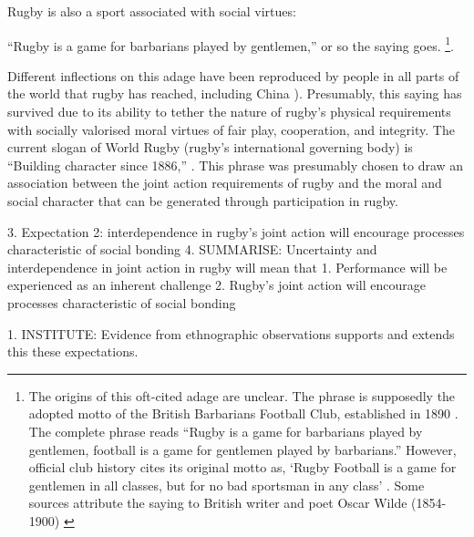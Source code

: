 \begin{CJK}{UTF8}{gbsn}
  Rugby is also a sport associated with social virtues:

``Rugby is a game for barbarians played by gentlemen,'' or so the saying goes. \footnote{The origins of this oft-cited adage are unclear.  The phrase is supposedly the adopted motto of the British Barbarians Football Club, established in 1890 \citep[34]{Dunning2005}.  The complete phrase reads ``Rugby is a game for barbarians played by gentlemen, football is a game for gentlemen played by barbarians.''  However, official club history cites its original motto as, ‘Rugby Football is a game for gentlemen in all classes, but for no bad sportsman in any class' \citep[vii]{Starmer-Smith1977}.  Some sources attribute the saying to British writer and poet Oscar Wilde (1854-1900) \citep{Fleenor2015}}.

Different inflections on this adage have been reproduced by people in all parts of the world that rugby has reached, including China \citep[see][]{Taylor2010}).  Presumably, this saying has survived due to its ability to tether the nature of rugby's physical requirements with socially valorised moral virtues of fair play, cooperation, and integrity.  The current slogan of World Rugby (rugby's international governing body) is ``Building character since 1886,'' \citep{WorldRugby2017}.  This phrase was presumably chosen to draw an association between the joint action requirements of rugby and the moral and social character that can be generated through participation in rugby.

        3. Expectation 2:  interdependence in rugby's joint action will encourage processes characteristic of social bonding
        4. SUMMARISE:  Uncertainty and interdependence in joint action in rugby will mean that
        1. Performance will be experienced as an inherent challenge
        2. Rugby's joint action will encourage processes characteristic of social bonding


1. INSTITUTE: Evidence from ethnographic observations supports and extends this these expectations.


\end{CJK}
